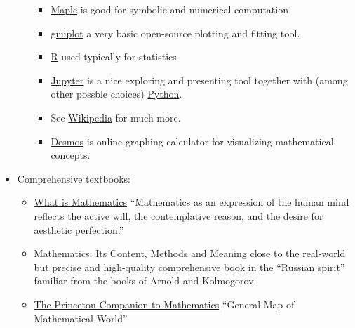 \documentclass{article}
\begin{document}
\begin{itemize}
\begin{itemize}
\begin{itemize}
            \item \href{https://www.maplesoft.com/}{Maple} is good for symbolic and numerical computation
        
            \item \href{http://www.gnuplot.info/}{gnuplot} a very basic open-source plotting and fitting tool.
        
            \item \href{https://www.r-project.org/}{R} used typically for statistics
        
            \item \href{https://jupyter.org/}{Jupyter} is a nice exploring and presenting tool together with (among other possble choices) \href{https://www.python.org/}{Python}.
            
            \item See \href{https://en.wikipedia.org/wiki/List_of_open-source_software_for_mathematics}{Wikipedia} for much more.

            \item \href{https://www.desmos.com/calculator}{Desmos} is online graphing calculator for visualizing mathematical concepts.
        \end{itemize}
    \end{itemize}
    
    \item Comprehensive textbooks:
    \begin{itemize}
        \item \href{https://www.goodreads.com/book/show/584620.What_Is_Mathematics_}{What is Mathematics} ``Mathematics as an expression of the human mind reflects the active will, the contemplative reason, and the desire for aesthetic perfection.''
        
        \item \href{https://www.goodreads.com/book/show/405880.Mathematics}{Mathematics: Its Content, Methods and Meaning} close to the real-world but precise and high-quality comprehensive book in the ``Russian spirit'' familiar from the books of Arnold and Kolmogorov.
        
        \item \href{https://www.goodreads.com/book/show/1471873.The_Princeton_Companion_to_Mathematics}{The Princeton Companion to Mathematics} ``General Map of Mathematical World''
    \end{itemize}
    

\end{itemize}
\end{document}
